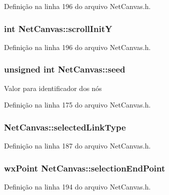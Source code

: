 Definição na linha 196 do arquivo Net\+Canvas.\+h.

\subsubsection[{scroll\+InitY}]{\setlength{\rightskip}{0pt plus 5cm}int Net\+Canvas\+::scroll\+InitY}\label{class_net_canvas_aeccd27e516d96c819f61e91c5aa38618}


Definição na linha 196 do arquivo Net\+Canvas.\+h.

\subsubsection[{seed}]{\setlength{\rightskip}{0pt plus 5cm}unsigned int Net\+Canvas\+::seed}\label{class_net_canvas_a7805b26106b8978326f61a62caeface5}
Valor para identificador dos nós 

Definição na linha 175 do arquivo Net\+Canvas.\+h.

\subsubsection[{selected\+Link\+Type}]{ Net\+Canvas\+::selected\+Link\+Type}\label{class_net_canvas_ad557c8dc0f491ee2e3bc8ae021cc3e73}


Definição na linha 187 do arquivo Net\+Canvas.\+h.

\subsubsection[{selection\+End\+Point}]{\setlength{\rightskip}{0pt plus 5cm}wx\+Point Net\+Canvas\+::selection\+End\+Point}\label{class_net_canvas_af769e66c6249d762d367bd68e675a0ce}


Definição na linha 194 do arquivo Net\+Canvas.\+h.

